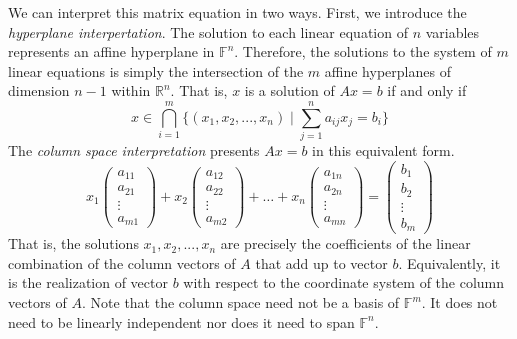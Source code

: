   We can interpret this matrix equation in two ways. First, we introduce the \textit{hyperplane interpertation}. The solution to each linear equation of $n$ variables represents an affine hyperplane in $\mathbb{F}^n$. Therefore, the solutions to the system of $m$ linear equations is simply the intersection of the $m$ affine hyperplanes of dimension $n-1$ within $\mathbb{R}^n$. That is, $x$ is a solution of $A x = b$ if and only if  
  \begin{equation}
    x \in \bigcap_{i = 1}^m \Big\{ (x_1, x_2, ..., x_n) \; | \; \sum_{j = 1}^n a_{i j} x_j = b_i \Big\}
  \end{equation}
  The \textit{column space interpretation} presents $A x = b$ in this equivalent form. 
  \begin{equation}
    x_1 \begin{pmatrix}
    a_{1 1} \\ a_{2 1} \\ \vdots \\ a_{m 1}
    \end{pmatrix} + x_2 \begin{pmatrix}
    a_{1 2} \\ a_{2 2} \\ \vdots \\ a_{m 2}
    \end{pmatrix} + \ldots + x_n \begin{pmatrix}
    a_{1 n} \\ a_{2 n} \\ \vdots \\ a_{m n}
    \end{pmatrix} = \begin{pmatrix}
    b_1 \\ b_2 \\ \vdots \\ b_m
    \end{pmatrix}
  \end{equation}
  That is, the solutions $x_1, x_2, ..., x_n$ are precisely the coefficients of the linear combination of the column vectors of $A$ that add up to vector $b$. Equivalently, it is the realization of vector $b$ with respect to the coordinate system of the column vectors of $A$. Note that the column space need not be a basis of $\mathbb{F}^m$. It does not need to be linearly independent nor does it need to span $\mathbb{F}^n$. 


